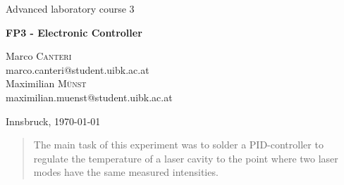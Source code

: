\documentclass[a4paper,10pt]{article}
\begin{document}
\begin{titlepage}
 \begin{center}
	\Large{Advanced laboratory course 3}
	\end{center}
	\begin{center}
	 \LARGE{\textbf{FP3 - Electronic Controller}}
	\end{center}

	\begin{center}

	\large Marco \textsc{Canteri} \\
	marco.canteri@student.uibk.ac.at\\
	\large Maximilian \textsc{Münst} \\
	maximilian.muenst@student.uibk.ac.at
	\end{center}

	\begin{center}
	\vspace{1cm}
	Innsbruck, \today
	\vspace{1cm}
	\end{center}

	\begin{abstract}
    The main task of this experiment was to solder a PID-controller to regulate the temperature of a laser cavity to the point where two laser modes have the same measured intensities.
  \end{abstract}
    \vspace{1cm}


\end{titlepage}
\end{document}

